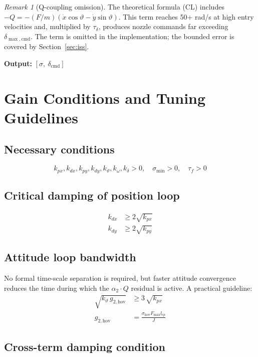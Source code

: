 \documentclass[11pt,a4paper]{article}
\theoremstyle{plain}
\theoremstyle{remark}
\newtheorem{remark}{Remark}[section]
\newcommand{\vth}{\vartheta}
\newcommand{\dcmd}{\delta_{\mathrm{cmd}}}
\newcommand{\Fmax}{F_{\max}}
\begin{document}
\begin{remark}[Q-coupling omission]
The theoretical formula (CL) includes $-Q = -(F/m)(\dot x\cos\vth - \dot y\sin\vth)$. This term reaches 50+ rad/s at high entry velocities and, multiplied by $\tau_\delta$, produces nozzle commands far exceeding $\delta_{\max,\mathrm{cmd}}$. The term is omitted in the implementation; the bounded error is covered by Section~\ref{sec:iss}.
\end{remark}

\textbf{Output:} $[\sigma,\ \dcmd]$

\section{Gain Conditions and Tuning Guidelines}

\subsection*{Necessary conditions}
\[
  k_{px}, k_{dx}, k_{py}, k_{dy}, k_\vth, k_\omega, k_\delta > 0, \quad \sigma_{\min} > 0, \quad \tau_f > 0
\]

\subsection*{Critical damping of position loop}
\begin{align}
  k_{dx} &\geq 2\sqrt{k_{px}} \\
  k_{dy} &\geq 2\sqrt{k_{py}}
\end{align}

\subsection*{Attitude loop bandwidth}

No formal time-scale separation is required, but faster attitude convergence reduces the time during which the $\alpha_2\cdot Q$ residual is active. A practical guideline:
\begin{align}
  \sqrt{k_\vth\, g_{2,\mathrm{hov}}} &\geq 3\,\sqrt{k_{px}} \\
  g_{2,\mathrm{hov}} &= \frac{\sigma_{\mathrm{hov}} \Fmax l_{cp}}{J}
\end{align}

\subsection*{Cross-term damping condition}
\end{document}
